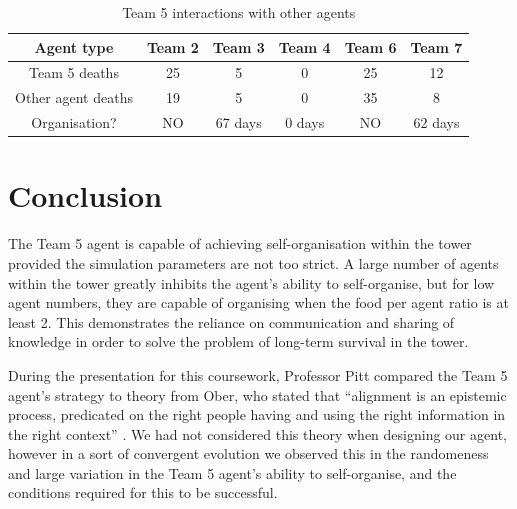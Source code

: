 \begin{table}
    \centering
    \begin{tabular}{|c|c|c|c|c|c|}
        \hline
        \textbf{Agent type} & \textbf{Team 2} & \textbf{Team 3}& \textbf{Team 4} & \textbf{Team 6} & \textbf{Team 7}\\
        \hline
        Team 5 deaths & 25 & 5 & 0 & 25 & 12 \\
        \hline
        Other agent deaths & 19 & 5 & 0 & 35 & 8 \\
        \hline
        Organisation? & NO & 67 days & 0 days & NO & 62 days \\
        \hline
    \end{tabular}
    \caption{Team 5 interactions with other agents}
    \label{tab:team5-self-org-agents}
\end{table}

\section{Conclusion}\label{sec:team5-conclusion}
The Team 5 agent is capable of achieving self-organisation within the tower provided the simulation parameters are not too strict. A large number of agents within the tower greatly inhibits the agent's ability to self-organise, but for low agent numbers, they are capable of organising when the food per agent ratio is at least 2. This demonstrates the reliance on communication and sharing of knowledge in order to solve the problem of long-term survival in the tower.

During the presentation for this coursework, Professor Pitt compared the Team 5 agent's strategy to theory from Ober, who stated that ``alignment is an epistemic process, predicated on the right people having and using the right information in the right context'' \cite{ober_athens}. We had not considered this theory when designing our agent, however in a sort of convergent evolution we observed this in the randomeness and large variation in the Team 5 agent's ability to self-organise, and the conditions required for this to be successful.
